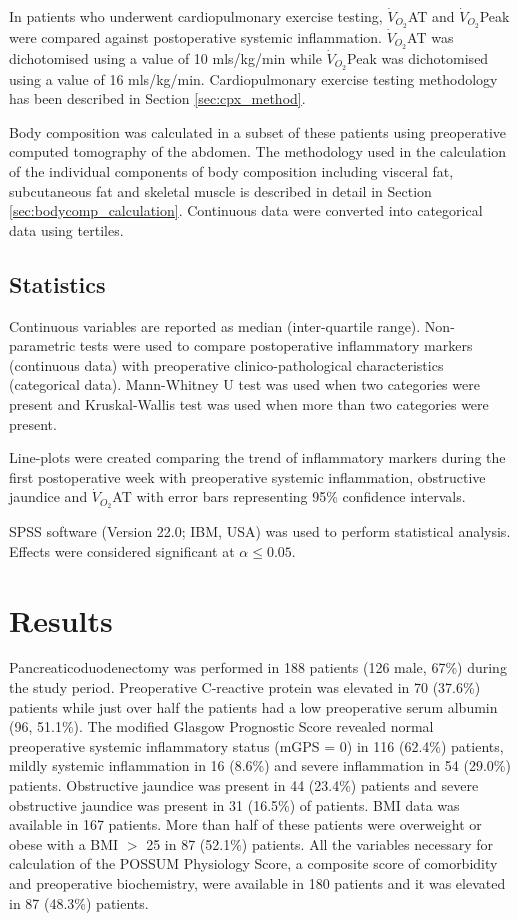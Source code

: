 In patients who underwent cardiopulmonary exercise testing, $\dot{V}_{O_2}$AT and $\dot{V}_{O_2}$Peak were compared against postoperative systemic inflammation. 
$\dot{V}_{O_2}$AT was dichotomised using a value of 10 mls/kg/min while $\dot{V}_{O_2}$Peak was dichotomised using a value of 16 mls/kg/min. 
Cardiopulmonary exercise testing methodology has been described in Section \ref{sec:cpx_method}.

Body composition was calculated in a subset of these patients using preoperative computed tomography of the abdomen. 
The methodology used in the calculation of the individual components of body composition including visceral fat, subcutaneous fat and skeletal muscle is described in detail in Section \ref{sec:bodycomp_calculation}. 
Continuous data were converted into categorical data using tertiles.

\subsection{Statistics}

Continuous variables are reported as median (inter-quartile range).
Non-parametric tests were used to compare postoperative inflammatory markers (continuous data) with preoperative clinico-pathological characteristics (categorical data). 
Mann-Whitney U test was used when two categories were present and Kruskal-Wallis test was used when more than two categories were present.

Line-plots were created comparing the trend of inflammatory markers during the first postoperative week with preoperative systemic inflammation, obstructive jaundice and $\dot{V}_{O_2}$AT with error bars representing 95\% confidence intervals. 

SPSS software (Version 22.0; IBM, USA) was used to perform statistical analysis. 
Effects were considered significant at $\alpha \leq0.05$. 

\section{Results}

Pancreaticoduodenectomy was performed in 188 patients (126 male, 67\%) during the study period.
Preoperative C-reactive protein was elevated in 70 (37.6\%) patients while just over half the patients had a low preoperative serum albumin (96, 51.1\%). 
The modified Glasgow Prognostic Score revealed normal preoperative systemic inflammatory status (mGPS = 0) in 116 (62.4\%) patients, mildly systemic inflammation in 16 (8.6\%) and severe inflammation in 54 (29.0\%) patients. 
Obstructive jaundice was present in 44 (23.4\%) patients and severe obstructive jaundice was present in 31 (16.5\%) of patients. 
BMI data was available in 167 patients. 
More than half of these patients were overweight or obese with a BMI $>$ 25 in 87 (52.1\%) patients.
All the variables necessary for calculation of the POSSUM Physiology Score, a composite score of comorbidity and preoperative biochemistry, were available in 180 patients and it was elevated in 87 (48.3\%) patients.

